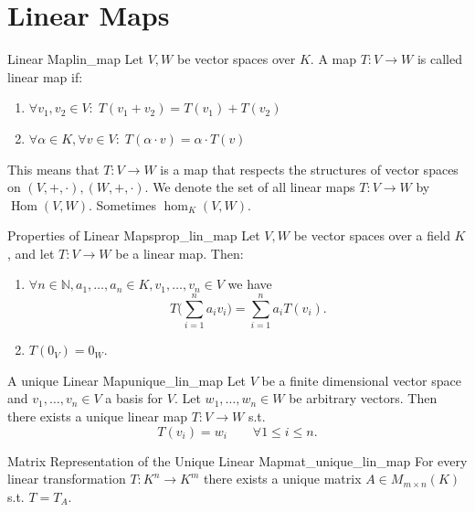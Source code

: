 % 
%
%
%

\section{Linear Maps}

\begin{definition}{Linear Map}{lin_map}
	Let $V,W$ be vector spaces over $K$. A map $T:V \to W$ is called linear map if:
	\begin{enumerate}
		\item $\forall v_1,v_2 \in V: \; T(v_1 + v_2) =T(v_1) + T(v_2)$
		\item $\forall \alpha \in K, \forall v \in V: \; T(\alpha \cdot v) = \alpha \cdot T(v)$
	\end{enumerate}
	This means that $T:V \to W$ is a map that respects the structures of vector spaces on $(V, +, \cdot), (W, +, \cdot)$.
	We denote the set of all linear maps $T:V \to W$ by $\operatorname{Hom}(V, W)$. Sometimes $\hom_K(V,W)$.
\end{definition}

\begin{proposition}{Properties of Linear Maps}{prop_lin_map}
	Let $V, W$ be vector spaces over a field $K$, and let $T:V \to W$ be a linear map. Then:
	\begin{enumerate}
		\item $\forall n \in \mathbb{N}, a_1, \hdots , a_n \in K, v_1, \hdots , v_n \in V$ we have
		\[
		T\big(\sum_{i=1}^{n} a_i v_i\big) = \sum_{i=1}^{n} a_i T(v_i).
		\]
		\item $T(0_V) = 0_W$.
	\end{enumerate}
	
\end{proposition}

\begin{theorem}{A unique Linear Map}{unique_lin_map}
	Let $V$ be a finite dimensional vector space and $v_1, \hdots ,v_n \in V$ a basis for $V$. Let $w_1, \hdots , w_n \in W$ be arbitrary vectors. Then there exists a unique linear map $T:V \to W$ s.t.
	\[
	T(v_i) = w_i \qquad \forall 1 \leq i \leq n.
	\]
\end{theorem}

\begin{lemma}{Matrix Representation of the Unique Linear Map}{mat_unique_lin_map}
	For every linear transformation $T:K^n \to K^m$ there exists a unique matrix $A \in M_{m\times n}(K)$ s.t. $T = T_A$.
\end{lemma}









